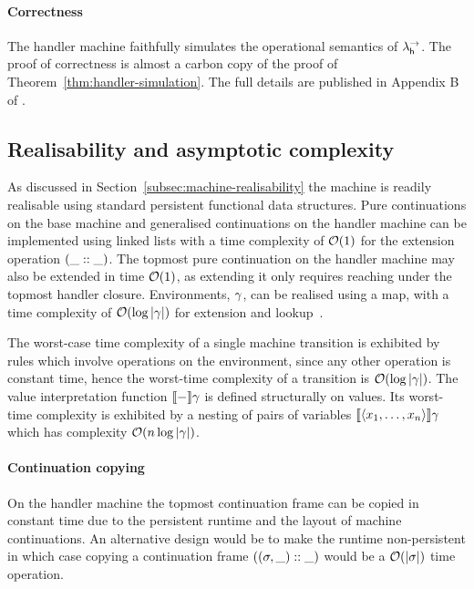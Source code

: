 \documentclass[12pt,phd,lfcs,twoside,openright,logo,leftchapter,normalheadings]{infthesis}
\theoremstyle{plain}
\theoremstyle{definition}
\begin{document}
\paragraph{Correctness}
%
The handler machine faithfully simulates the operational semantics of
$\lambda^\rightarrow_{\mathsf{h}}$.
%
The proof of correctness is almost a carbon copy of the proof of
Theorem~\ref{thm:handler-simulation}. The full details are published
in Appendix B of \citet{HillerstromLL20a}.%

\subsection{Realisability and asymptotic complexity}
\label{sec:realisability}
As discussed in Section~\ref{subsec:machine-realisability} the machine
is readily realisable using standard persistent functional data
structures.
%
Pure continuations on the base machine and generalised continuations
on the handler machine can be implemented using linked lists with a
time complexity of $\mathcal{O}(1)$ for the extension operation
$(\_::\_)$.
%
The topmost pure continuation on the handler machine may also be
extended in time $\mathcal{O}(1)$, as extending it only requires reaching
under the topmost handler closure.
%
Environments, $\gamma$, can be realised using a map, with a time
complexity of $\mathcal{O}(\log|\gamma|)$ for extension and
lookup~\citep{Okasaki99}.

The worst-case time complexity of a single machine transition is
exhibited by rules which involve operations on the environment, since
any other operation is constant time, hence the worst-time complexity
of a transition is $\mathcal{O}(\log|\gamma|)$.
%
The value interpretation function $\llbracket - \rrbracket \gamma$ is defined
structurally on values. Its worst-time complexity is exhibited by a
nesting of pairs of variables $\llbracket \langle x_1,\dots,x_n \rangle \rrbracket \gamma$ which
has complexity $\mathcal{O}(n\log|\gamma|)$.

\paragraph{Continuation copying} On the handler machine the topmost
continuation frame can be copied in constant time due to the
persistent runtime and the layout of machine continuations. An
alternative design would be to make the runtime non-persistent
%
in which case copying a continuation frame $((\sigma, \_) ::
\_)$ would be a $\mathcal{O}(|\sigma|)$ time operation.
\end{document}
